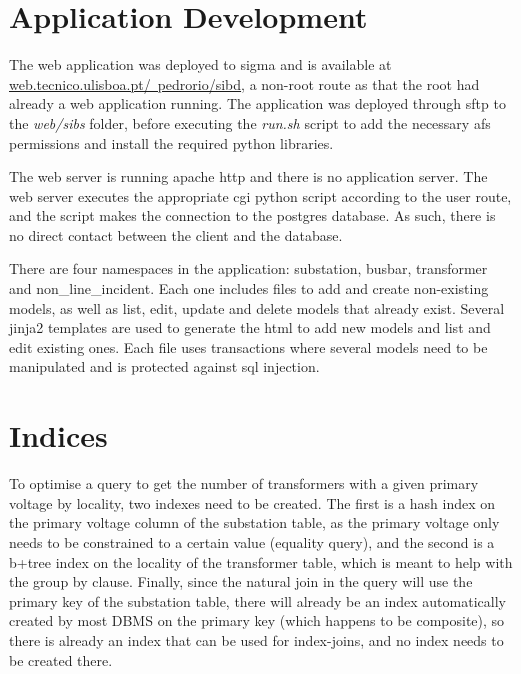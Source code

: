 \documentclass[titlepage]{article}
\numberwithin{figure}{section}
\numberwithin{table}{section}
\begin{document}

    \section*{Application Development}

    The web application was deployed to sigma and is available at
    \href{https://web.tecnico.ulisboa.pt/~pedrorio/sibd}{web.tecnico.ulisboa.pt/~pedrorio/sibd},
    a non-root route as that the root had already a web application running.
    The application was deployed through sftp to the \textit{web/sibs} folder,
    before executing the \textit{run.sh} script to add the necessary afs permissions
    and install the required python libraries.

    The web server is running apache http and there is no application server.
    The web server executes the appropriate cgi python script according to the user route,
    and the script makes the connection to the postgres database.
    As such, there is no direct contact between the client and the database.

    There are four namespaces in the application: substation, busbar, transformer and non\_line\_incident.
    Each one includes files to add and create non-existing models, as well as list, edit, update and delete
    models that already exist.
    Several jinja2 templates are used to generate the html to add new models and list and edit existing ones.
    Each file uses transactions where several models need to be manipulated and is protected against sql injection.

    \section*{Indices}

    To optimise a query to get the number of transformers with a given primary voltage
    by locality, two indexes need to be created.
    The first is a hash index on the primary voltage column of the substation table, as the primary voltage
    only needs to be constrained to a certain value (equality query), and the second is a b+tree index on the locality
    of the transformer table, which is meant to help with the group by clause.
    Finally, since the natural join in the query will use the primary key of the substation table, there will already be
    an index automatically created by most DBMS on the primary key (which happens to be composite), so there is already
    an index that can be used for index-joins, and no index needs to be created there.
\end{document}
